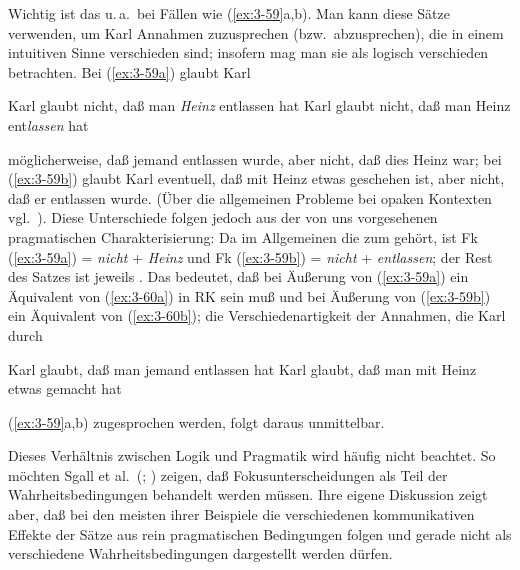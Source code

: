 \documentclass[output=paper]{langsci/langscibook}
\begin{document}
Wichtig ist das u.\,a.\ bei Fällen wie (\ref{ex:3-59}a,b). Man kann diese Sätze verwenden, um Karl Annahmen zuzusprechen (bzw.\ abzusprechen), die in
einem intuitiven Sinne verschieden sind; insofern mag man sie als logisch verschieden betrachten. Bei (\ref{ex:3-59a}) glaubt Karl
\begin{exe}
\ex
\label{ex:3-59}
\begin{xlist}
\ex
\label{ex:3-59a}
Karl glaubt nicht, daß man \textit{Heinz} entlassen hat
\ex
\label{ex:3-59b}
Karl glaubt nicht, daß man Heinz ent\textit{lassen} hat
\end{xlist}
\end{exe}
möglicherweise, daß jemand entlassen wurde, aber nicht, daß dies Heinz
war; bei (\ref{ex:3-59b}) glaubt Karl eventuell, daß mit Heinz etwas geschehen ist,
aber nicht, daß er entlassen wurde. (Über die allgemeinen Probleme bei
opaken Kontexten vgl.\ \citealt{Hoehle79c}). Diese Unterschiede folgen jedoch aus der von uns vorgesehenen pragmatischen Charakterisierung: Da im Allgemeinen die  zum  gehört, ist Fk (\ref{ex:3-59a}) = \textit{nicht} + \textit{Heinz} und Fk (\ref{ex:3-59b}) = \textit{nicht} + \textit{entlassen}; der Rest des Satzes ist jeweils . Das bedeutet, daß bei Äußerung von (\ref{ex:3-59a}) ein Äquivalent von (\ref{ex:3-60a}) in RK sein muß und bei Äußerung von (\ref{ex:3-59b}) ein Äquivalent von (\ref{ex:3-60b}); die Verschiedenartigkeit der Annahmen, die Karl durch
\begin{exe}
\ex
\label{ex:3-60}
\begin{xlist}
\ex
\label{ex:3-60a}
Karl glaubt, daß man jemand entlassen hat
\ex
\label{ex:3-60b}
Karl glaubt, daß man mit Heinz etwas gemacht hat
\end{xlist}
\end{exe}
(\ref{ex:3-59}a,b) zugesprochen werden, folgt daraus unmittelbar.

Dieses Verhältnis zwischen Logik und Pragmatik wird häufig nicht
beachtet. So möchten \zb Sgall et al.\ (\citealt{Sgall73}; \citealt[16ff]{Sgall77}) zeigen, daß Fokusunterscheidungen als Teil der Wahrheitsbedingungen behandelt werden müssen. Ihre eigene Diskussion zeigt aber, daß bei den meisten ihrer Beispiele die verschiedenen kommunikativen Effekte der Sätze aus rein pragmatischen Bedingungen folgen und gerade nicht als verschiedene
Wahrheitsbedingungen dargestellt werden dürfen.
\end{document}
